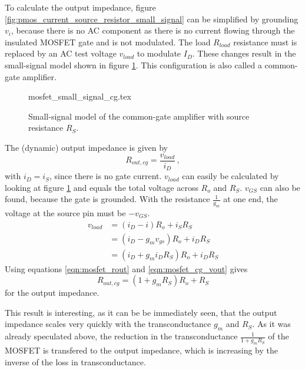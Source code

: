To calculate the output impedance, figure \ref{fig:pmos_current_source_resistor_small_signal} can be simplified by grounding $v_i$, because there is no AC component as there is no current flowing through the insulated MOSFET gate and is not modulated. The load $R_{load}$ resistance must is replaced by an AC test voltage $v_{load}$ to modulate $I_D$. These changes result in the small-signal model shown in figure \ref{fig:pmos_common_gate_amplifier}. This configuration is also called a common-gate amplifier.

\begin{figure}[ht]
    \centering
    {mosfet_small_signal_cg.tex}
    \caption{Small-signal model of the common-gate amplifier with source resistance $R_S$.}
    \label{fig:pmos_common_gate_amplifier}
\end{figure}

The (dynamic) output impedance is given by
\begin{equation}
    R_{out,cg} = \frac{v_{load}}{i_D}\,, \label{eqn:mosfet_rout}
\end{equation}
with $i_D = i_S$, since there is no gate current. $v_{load}$ can easily be calculated by looking at figure \ref{fig:pmos_common_gate_amplifier} and equals the total voltage across $R_o$ and $R_S$. $v_{GS}$ can also be found, because the gate is grounded. With the resistance $\frac{1}{g_m}$ at one end, the voltage at the source pin must be $-v_{GS}$.
\begin{align}
    v_{load} &= \left(i_D - i\right) R_o + i_S R_S \nonumber\\
    &= \left(i_D - g_m v_{gs}\right) R_o + i_D R_S \nonumber\\
    &= \left(i_D + g_m i_D R_S\right) R_o + i_D R_S \label{eqn:mosfet_cg_vout}
\end{align}
Using equations \ref{eqn:mosfet_rout} and \ref{eqn:mosfet_cg_vout} gives
\begin{equation}
    R_{out,cg} = \left(1 + g_m R_S\right) R_o + R_S \label{eqn:mosfet_cg_rout}
\end{equation}
for the output impedance.

This result is interesting, as it can be be immediately seen, that the output impedance scales very quickly with the transconductance $g_m$ and $R_S$. As it was already speculated above, the reduction in the transconductance $\frac{1}{1 + g_m R_S}$ of the MOSFET is transfered to the output impedance, which is increasing by the inverse of the loss in transconductance.

